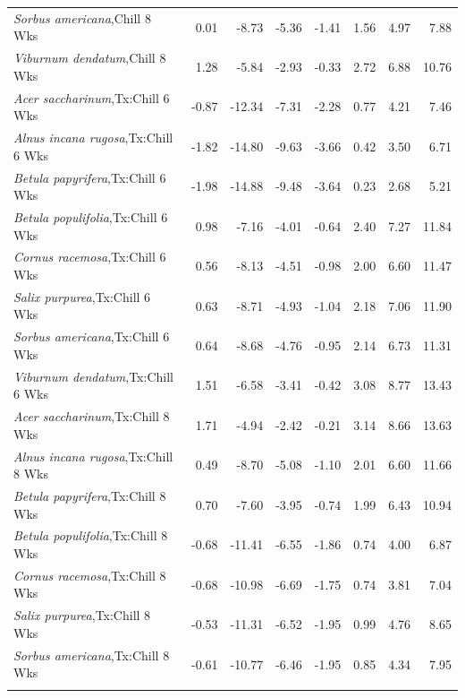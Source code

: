 \documentclass{article}\usepackage[]{graphicx}\usepackage[]{color}
\begin{document}
\begin{longtable}{lrrrrrrr}
  \textit{Sorbus americana},Chill 8 Wks & 0.01 & -8.73 & -5.36 & -1.41 & 1.56 & 4.97 & 7.88 \\ 
  \textit{Viburnum dendatum},Chill 8 Wks & 1.28 & -5.84 & -2.93 & -0.33 & 2.72 & 6.88 & 10.76 \\ 
  \textit{Acer saccharinum},Tx:Chill 6 Wks & -0.87 & -12.34 & -7.31 & -2.28 & 0.77 & 4.21 & 7.46 \\ 
  \textit{Alnus incana rugosa},Tx:Chill 6 Wks & -1.82 & -14.80 & -9.63 & -3.66 & 0.42 & 3.50 & 6.71 \\ 
  \textit{Betula papyrifera},Tx:Chill 6 Wks & -1.98 & -14.88 & -9.48 & -3.64 & 0.23 & 2.68 & 5.21 \\ 
  \textit{Betula populifolia},Tx:Chill 6 Wks & 0.98 & -7.16 & -4.01 & -0.64 & 2.40 & 7.27 & 11.84 \\ 
  \textit{Cornus racemosa},Tx:Chill 6 Wks & 0.56 & -8.13 & -4.51 & -0.98 & 2.00 & 6.60 & 11.47 \\ 
  \textit{Salix purpurea},Tx:Chill 6 Wks & 0.63 & -8.71 & -4.93 & -1.04 & 2.18 & 7.06 & 11.90 \\ 
  \textit{Sorbus americana},Tx:Chill 6 Wks & 0.64 & -8.68 & -4.76 & -0.95 & 2.14 & 6.73 & 11.31 \\ 
  \textit{Viburnum dendatum},Tx:Chill 6 Wks & 1.51 & -6.58 & -3.41 & -0.42 & 3.08 & 8.77 & 13.43 \\ 
  \textit{Acer saccharinum},Tx:Chill 8 Wks & 1.71 & -4.94 & -2.42 & -0.21 & 3.14 & 8.66 & 13.63 \\ 
  \textit{Alnus incana rugosa},Tx:Chill 8 Wks & 0.49 & -8.70 & -5.08 & -1.10 & 2.01 & 6.60 & 11.66 \\ 
  \textit{Betula papyrifera},Tx:Chill 8 Wks & 0.70 & -7.60 & -3.95 & -0.74 & 1.99 & 6.43 & 10.94 \\ 
  \textit{Betula populifolia},Tx:Chill 8 Wks & -0.68 & -11.41 & -6.55 & -1.86 & 0.74 & 4.00 & 6.87 \\ 
  \textit{Cornus racemosa},Tx:Chill 8 Wks & -0.68 & -10.98 & -6.69 & -1.75 & 0.74 & 3.81 & 7.04 \\ 
  \textit{Salix purpurea},Tx:Chill 8 Wks & -0.53 & -11.31 & -6.52 & -1.95 & 0.99 & 4.76 & 8.65 \\ 
  \textit{Sorbus americana},Tx:Chill 8 Wks & -0.61 & -10.77 & -6.46 & -1.95 & 0.85 & 4.34 & 7.95 \\ 
   \hline
\hline
\label{tab:suppmodtotbio}
\end{longtable}



\end{document}
